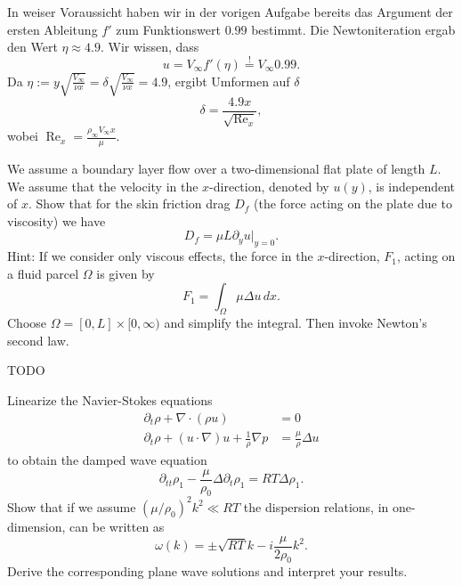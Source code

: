 \documentclass[12pt]{exam}
\newcommand{\del}{\partial}
\begin{document}
\begin{questions}
    \begin{solution}
        In weiser Voraussicht haben wir in der vorigen Aufgabe bereits das Argument der ersten Ableitung $f'$ zum Funktionswert $0.99$ bestimmt. Die Newtoniteration ergab den Wert $\eta \approx 4.9$. Wir wissen, dass 
        \begin{equation*}
            u = V_{\infty} f'(\eta) \overset{!}{=} V_{\infty} 0.99.
        \end{equation*}
        Da $\eta := y \sqrt{\frac{V_{\infty}}{\nu x}} = \delta \sqrt{\frac{V_{\infty}}{\nu x}} = 4.9$, ergibt Umformen auf $\delta$
        \begin{equation*}
            \delta = \frac{4.9 x}{\sqrt{\operatorname{Re}_x}},
        \end{equation*}
        wobei $\operatorname{Re}_x = \frac{\rho_{\infty} V_{\infty} x}{\mu}$.
    \end{solution}
    
    
    \question We assume a boundary layer flow over a two-dimensional flat plate of length $L$. We assume that the velocity in the $x$-direction, denoted by $u(y)$, is independent of $x$. Show that for the skin friction drag $D_f$ (the force acting on the plate due to viscosity) we have
    \begin{equation*}
        D_f = \mu L \del_y u \vert_{y=0}.
    \end{equation*}
    Hint: If we consider only viscous effects, the force in the $x$-direction, $F_1$, acting on a fluid parcel $\Omega$ is given by
    \begin{equation*}
        F_1 = \int_\Omega \mu \Delta u \, dx.
    \end{equation*}
    Choose $\Omega = [0, L] \times [0, \infty)$ and simplify the integral. Then invoke Newton's second law.
    
    \begin{solution}
        {\color{red} TODO}
    \end{solution}
    
    
    \question Linearize the Navier-Stokes equations
    \begin{align*}
        \del_t \rho + \nabla \cdot (\rho u) &= 0 \\
        \del_t \rho + (u \cdot \nabla) u + \frac{1}{\rho} \nabla p &= \frac{\mu}{\rho} \Delta u
    \end{align*}
    to obtain the damped wave equation
    \begin{equation*}
        \del_{tt} \rho_1 - \frac{\mu}{\rho_0} \Delta \del_t \rho_1 = RT \Delta \rho_1.
    \end{equation*}
    Show that if we assume $(\mu / \rho_0)^2 k^2 \ll RT$ the dispersion relations, in one-dimension, can be written as
    \begin{equation*}
        \omega(k) = \pm \sqrt{RT}k - i \frac{\mu}{2 \rho_0} k^2.
    \end{equation*}
    Derive the corresponding plane wave solutions and interpret your results.
    

\end{questions}
\end{document}

